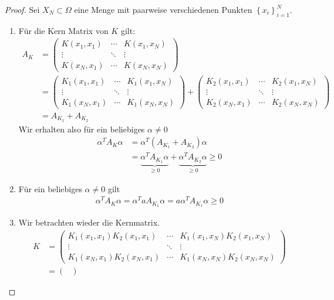 \begin{proof}
Sei $X_N \subset \Omega$ eine Menge mit paarweise verschiedenen Punkten $\left\{x_i\right\}_{i=1}^N$.
\begin{enumerate}
\item
Für die Kern Matrix von $K$ gilt:
\begin{align*}
A_K &= 
\begin{pmatrix}
K(x_1, x_1) & \cdots & K(x_1, x_N) \\ 
\vdots & \ddots & \vdots \\ 
K(x_N, x_1) & \cdots & K(x_N, x_N)
\end{pmatrix} \\
&=
\begin{pmatrix}
K_1(x_1, x_1) & \cdots & K_1(x_1, x_N) \\ 
\vdots & \ddots & \vdots \\ 
K_1(x_N, x_1) & \cdots & K_1(x_N, x_N)
\end{pmatrix} 
+
\begin{pmatrix}
K_2(x_1, x_1) & \cdots & K_2(x_1, x_N) \\ 
\vdots & \ddots & \vdots \\ 
K_2(x_N, x_1) & \cdots & K_2(x_N, x_N)
\end{pmatrix} \\
&= A_{K_1} + A_{K_2}
\end{align*}
Wir erhalten also für ein beliebiges $\alpha \neq 0$
\begin{align*}
\alpha^T A_K \alpha &= \alpha^T \left( A_{K_1} + A_{K_2} \right) \alpha \\
&=\underbrace{\alpha^T A_{K_1} \alpha}_{\geq 0} + \underbrace{\alpha^T A_{K_2} \alpha}_{\geq 0} \geq 0
\end{align*}
\item
Für ein beliebiges $\alpha \neq 0$ gilt
\begin{align*}
\alpha^T A_K \alpha = \alpha^T a A_{K_1} \alpha = a \alpha^T A_{K_1} \alpha \geq 0
\end{align*}
\item
Wir betrachten wieder die Kernmatrix.
\begin{align*}
K &= 
\begin{pmatrix}
K_1(x_1,x_1)K_2(x_1, x_1) & \cdots & K_1(x_1,x_N)K_2(x_1, x_N) \\ 
\vdots & \ddots & \vdots \\ 
K_1(x_N,x_1)K_2(x_N, x_1) & \cdots & K_1(x_N,x_N)K_2(x_N, x_N)
\end{pmatrix} \\
&= 
\begin{pmatrix}

\end{pmatrix}
\end{align*}
\end{enumerate}
\end{proof}
